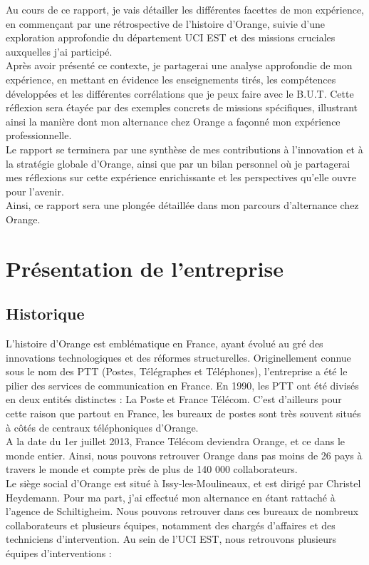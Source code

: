 \documentclass[12pt, a4paper]{article}
\begin{document}
Au cours de ce rapport, je vais détailler les différentes facettes de mon expérience,
en commençant par une rétrospective de l'histoire d'Orange, suivie d'une exploration
approfondie du département UCI EST et des missions cruciales auxquelles
j'ai participé.\\
Après avoir présenté ce contexte, je partagerai une analyse approfondie
de mon expérience, en mettant en évidence les enseignements tirés,
les compétences développées et les différentes corrélations 
que je peux faire avec le B.U.T. Cette réflexion sera étayée par des exemples
concrets de missions spécifiques, illustrant ainsi la manière dont mon
alternance chez Orange a façonné mon expérience professionnelle.\\
Le rapport se terminera par une synthèse de mes contributions à
l'innovation et à la stratégie globale d'Orange, ainsi que par un
bilan personnel où je partagerai mes réflexions sur cette expérience
enrichissante et les perspectives qu'elle ouvre pour l'avenir.\\
Ainsi, ce rapport sera une plongée détaillée dans mon parcours
d'alternance chez Orange.


\newpage
\section{Présentation de l'entreprise}
\subsection{Historique}
L'histoire d'Orange est emblématique en France, ayant évolué au gré des
innovations technologiques et des réformes structurelles. Originellement connue
sous le nom des PTT (Postes, Télégraphes et Téléphones), 
l'entreprise a été le pilier des services de communication en
France. En 1990, les PTT ont été divisés en deux entités distinctes : La Poste et France Télécom.
C'est d'ailleurs pour cette raison que partout en France, les bureaux de postes 
sont très souvent situés à côtés de centraux téléphoniques d'Orange.\\

A la date du 1er juillet 2013, France Télécom deviendra Orange, et ce dans le monde entier.
Ainsi, nous pouvons retrouver Orange dans pas moins de 26 pays à travers le monde et 
compte près de plus de 140 000 collaborateurs.\\

Le siège social d'Orange est situé à Issy-les-Moulineaux,
et est dirigé par Christel Heydemann. Pour ma part, 
j'ai effectué mon alternance en étant rattaché 
à l'agence de Schiltigheim. Nous pouvons retrouver 
dans ces bureaux de nombreux collaborateurs et 
plusieurs équipes, notamment des chargés d'affaires
et des techniciens d'intervention. Au sein de l'UCI EST,
nous retrouvons plusieurs équipes d'interventions :\\
\end{document}
